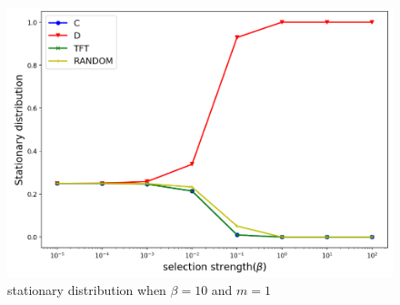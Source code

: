 \documentclass{article}
\begin{document}
\begin{figure}[h]
  \centering
  \includegraphics[scale=0.4]{figures/stationary-beta1.png}
  \caption{stationary distribution when $\beta = 10$ and $m=1$}
  \label{fig:stationary-beta1}
\end{figure}
\end{document}

